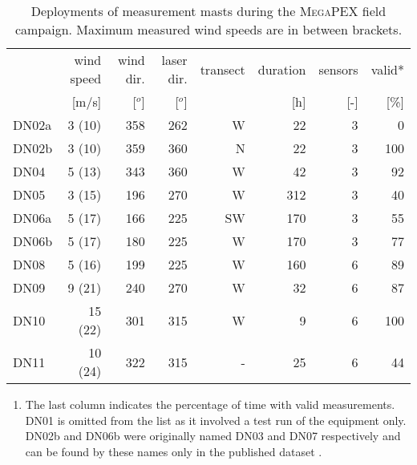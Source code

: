 \documentclass[preprint,12pt,authoryear,a4paper]{elsarticle}
\begin{document}
\begin{table}[h]
  \centering
  \caption{Deployments of measurement masts during the \textsc{MegaPEX} field
    campaign. Maximum measured wind speeds are in between brackets.}
  \label{tab:deployments}
  \begin{tabular}[h]{lrrrrrrr}
    \hline
               & wind speed &  wind dir. & laser dir. &   transect &   duration & sensors &     valid* \\
               &      [m/s] &     [$^o$] &     [$^o$] &            &        [h] &     [-] &       [\%] \\
    \hline
    DN02a      &     3 (10) &        358 &        262 &          W &         22 &       3 &          0 \\
    DN02b      &     3 (10) &        359 &        360 &          N &         22 &       3 &        100 \\
    DN04       &     5 (13) &        343 &        360 &          W &         42 &       3 &         92 \\
    DN05       &     3 (15) &        196 &        270 &          W &        312 &       3 &         40 \\
    DN06a      &     5 (17) &        166 &        225 &         SW &        170 &       3 &         55 \\
    DN06b      &     5 (17) &        180 &        225 &          W &        170 &       3 &         77 \\
    DN08       &     5 (16) &        199 &        225 &          W &        160 &       6 &         89 \\
    DN09       &     9 (21) &        240 &        270 &          W &         32 &       6 &         87 \\
    DN10       &    15 (22) &        301 &        315 &          W &          9 &       6 &        100 \\
    DN11       &    10 (24) &        322 &        315 &          - &         25 &       6 &         44 \\
    \hline
  \end{tabular}

  \footnotesize{
    \begin{enumerate}[{*}]
    \item The last column indicates the percentage of time with
      valid measurements. DN01 is omitted from the list as it
      involved a test run of the equipment only. DN02b and DN06b
      were originally named DN03 and DN07 respectively and can be
      found by these names only in the published dataset
      \citep{megapex}.
    \end{enumerate}}
\end{table}
\end{document}
